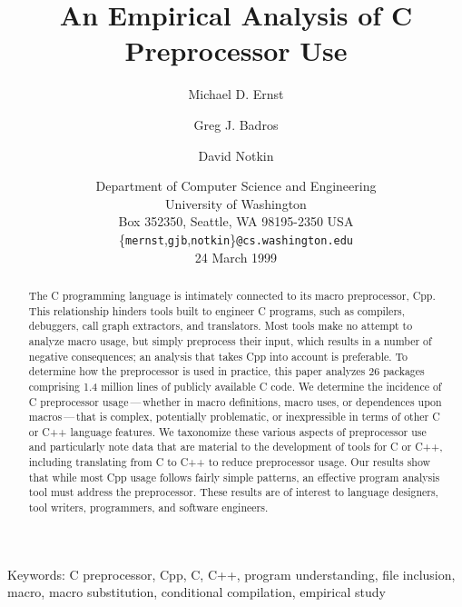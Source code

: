 \documentclass[10pt]{article}
\def\numpackages{26}
\def\numlinesalmost{1.4 million}
\begin{document}
% 


\title{An Empirical Analysis of C Preprocessor Use}

\author{Michael D. Ernst \and Greg J. Badros \and David Notkin}

\date{%
Department of Computer Science and Engineering \\
University of Washington \\
Box 352350, Seattle, WA  98195-2350  USA \\
{\small \{{\tt mernst},{\tt gjb},{\tt notkin}\}{\tt @cs.washington.edu}} \\
24 March 1999}  

\maketitle

\begin{abstract}
  The C programming language is intimately connected to its macro
  preprocessor, Cpp.  This relationship hinders tools built to
  engineer C programs, such as compilers, debuggers, call graph
  extractors, and translators.  Most tools make no attempt to analyze
  macro usage, but simply preprocess their input, which results in a
  number of negative consequences; an analysis that takes Cpp into
  account is preferable.  To determine how the preprocessor is used in
  practice, this paper analyzes {\numpackages} packages comprising
  {\numlinesalmost} lines of publicly available C code.  We determine
  the incidence of C preprocessor usage\,---\,whether in macro
  definitions, macro uses, or dependences upon macros\,---\,that is
  complex, potentially problematic, or inexpressible in terms of other
  C or C++ language features.  We taxonomize these various aspects of
  preprocessor use and particularly note data that are material to the
  development of tools for C or C++, including translating from C to
  C++ to reduce preprocessor usage.  Our results show that while most
  Cpp usage follows fairly simple patterns, an effective program
  analysis tool must address the preprocessor.  These results are of
  interest to language designers, tool writers, programmers, and
  software engineers.
\end{abstract}

\noindent
Keywords: C preprocessor, Cpp, C, C++, program understanding, file
inclusion, macro, macro substitution, conditional compilation, empirical study
\end{document}
